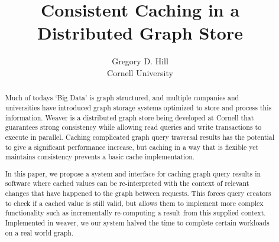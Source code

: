 \documentclass[letterpaper,twocolumn,11pt,tight]{article}
\begin{document}
\newtheorem{claim}{Claim}
\newtheorem{defn}{Definition}
\newcommand{\hilight}[1]{\colorbox{yellow}{#1}}
\newcommand{\secref}[1]{Section~\ref{sec:#1}}
\newcommand{\figref}[1]{Figure~\ref{fig:#1}}
\newcommand{\srcref}[1]{Figure~\ref{fig:#1}}
\newcommand{\clmref}[1]{Claim~\ref{claim:#1}}
\newcommand{\insertfig}[4]{\begin{figure}\centering\texttt{[image: \#2]}\caption{#3}\label{fig:#4}\end{figure}}
\newcommand{\insertsrc}[3]{\begin{figure}\centering\caption{#2}\label{fig:#3}\end{figure}}

\title{Consistent Caching in a Distributed Graph Store}

\author{\rm Gregory D. Hill \qquad
        \\Cornell University}

\maketitle
\begin{abstract}
Much of todays `Big Data' is graph structured, and multiple companies and universities have introduced graph storage systems optimized to store and process this information.
Weaver is a distributed graph store being developed at Cornell that guarantees strong consistency while allowing read queries and write transactions to execute in parallel.
Caching complicated graph query traversal results has the potential to give a significant performance increase,
but caching in a way that is flexible yet maintains consistency prevents a basic cache implementation.

In this paper, we propose a system and interface for caching graph query results in software where cached values can be re-interpreted with the context of relevant changes that have happened to the graph between requests.
This forces query creators to check if a cached value is still valid, but allows them to implement more complex functionality such as incrementally re-computing a result from this supplied context.
Implemented in weaver, we our system halved the time to complete certain workloads on a real world graph. %
\end{abstract}
\end{document}
